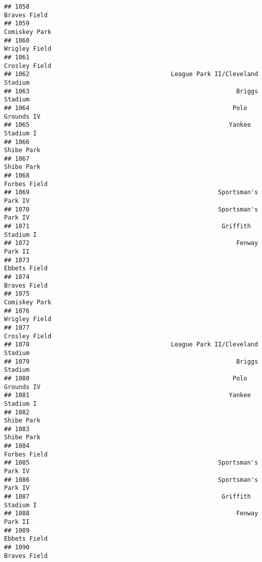 \documentclass[]{article}
\begin{document}
\begin{verbatim}
## 1058                                                           Braves Field
## 1059                                                          Comiskey Park
## 1060                                                          Wrigley Field
## 1061                                                          Crosley Field
## 1062                                       League Park II/Cleveland Stadium
## 1063                                                         Briggs Stadium
## 1064                                                        Polo Grounds IV
## 1065                                                       Yankee Stadium I
## 1066                                                             Shibe Park
## 1067                                                             Shibe Park
## 1068                                                           Forbes Field
## 1069                                                    Sportsman's Park IV
## 1070                                                    Sportsman's Park IV
## 1071                                                     Griffith Stadium I
## 1072                                                         Fenway Park II
## 1073                                                           Ebbets Field
## 1074                                                           Braves Field
## 1075                                                          Comiskey Park
## 1076                                                          Wrigley Field
## 1077                                                          Crosley Field
## 1078                                       League Park II/Cleveland Stadium
## 1079                                                         Briggs Stadium
## 1080                                                        Polo Grounds IV
## 1081                                                       Yankee Stadium I
## 1082                                                             Shibe Park
## 1083                                                             Shibe Park
## 1084                                                           Forbes Field
## 1085                                                    Sportsman's Park IV
## 1086                                                    Sportsman's Park IV
## 1087                                                     Griffith Stadium I
## 1088                                                         Fenway Park II
## 1089                                                           Ebbets Field
## 1090                                                           Braves Field

\end{verbatim}
\end{document}
